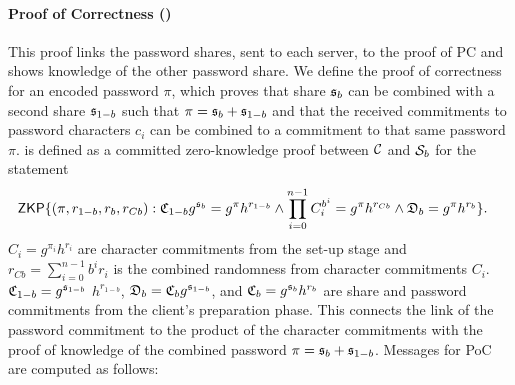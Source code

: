 \paragraph{Proof of Correctness (\PoC)}
This proof links the password shares, sent to each server, to the proof of \ac{PC} and shows knowledge of the other password share.
We define the proof of correctness for an encoded password $\pi$, which proves that share $\mathfrak{s}_{b}$ can be combined with a second share $\mathfrak{s}_{1-b}$ such that $\pi=\mathfrak{s}_{b}+\mathfrak{s}_{1-b}$ and that the received commitments to password characters $c_i$ can be combined to a commitment to that same password $\pi$.
\PoC is defined as a committed zero-knowledge proof between $\mathcal{C}$ and $\mathcal{S}_b$ for the statement
\begin{align*}
&\mathsf{ZKP}\{(\pi,r_{1-b},r_b,r_{Cb}): \mathfrak{C}_{1-b}g^{\mathfrak{s}_{b}}=g^{\pi}h^{r_{1-b}}  \wedge  \prod_{i=0}^{n-1}C_i^{b^i}=g^{\pi}h^{r_{Cb}}  \wedge  \mathfrak{D}_{b}=g^{\pi}h^{r_{b}}\}. 
\end{align*}
$C_i=g^{\pi_i}h^{r_i}$ are character commitments from the set-up stage and $r_{Cb}=\sum_{i=0}^{n-1}b^i r_i$ is the combined randomness from character commitments $C_i$.
$\mathfrak{C}_{1-b}=g^{\mathfrak{s}_{1-b}}$ $h^{r_{1-b}}$, $\mathfrak{D}_{b}=\mathfrak{C}_{b}g^{\mathfrak{s}_{1-b}}$, and $\mathfrak{C}_{b}=g^{\mathfrak{s}_{b}}h^{r_{b}}$ are share and password commitments from the client's preparation phase.
This connects the link of the password commitment to the product of the character commitments with the proof of knowledge of the combined password $\pi=\mathfrak{s}_b+\mathfrak{s}_{1-b}$.
Messages for \ac{PoC} are computed as follows:


